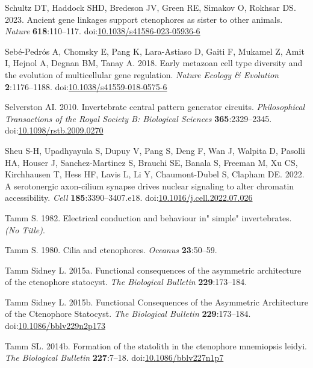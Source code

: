 \documentclass[
  11pt,
]{article}
\newlength{\cslhangindent}
\newenvironment{CSLReferences}[2] %
 {\begin{list}{}{%
  \setlength{\itemindent}{0pt}
  \setlength{\leftmargin}{0pt}
  \setlength{\parsep}{0pt}
  \ifodd #1
   \setlength{\leftmargin}{\cslhangindent}
   \setlength{\itemindent}{-1\cslhangindent}
  \fi
  \setlength{\itemsep}{#2\baselineskip}}}
 {\end{list}}
\begin{document}
\begin{CSLReferences}{1}{0}
Schultz DT, Haddock SHD, Bredeson JV, Green RE, Simakov O, Rokhsar DS.
2023. Ancient gene linkages support ctenophores as sister to other
animals. \emph{Nature} \textbf{618}:110--117.
doi:\href{https://doi.org/10.1038/s41586-023-05936-6}{10.1038/s41586-023-05936-6}

Sebé-Pedrós A, Chomsky E, Pang K, Lara-Astiaso D, Gaiti F, Mukamel Z,
Amit I, Hejnol A, Degnan BM, Tanay A. 2018. Early metazoan cell type
diversity and the evolution of multicellular gene regulation.
\emph{Nature Ecology \& Evolution} \textbf{2}:1176--1188.
doi:\href{https://doi.org/10.1038/s41559-018-0575-6}{10.1038/s41559-018-0575-6}

Selverston AI. 2010. Invertebrate central pattern generator circuits.
\emph{Philosophical Transactions of the Royal Society B: Biological
Sciences} \textbf{365}:2329--2345.
doi:\href{https://doi.org/10.1098/rstb.2009.0270}{10.1098/rstb.2009.0270}

Sheu S-H, Upadhyayula S, Dupuy V, Pang S, Deng F, Wan J, Walpita D,
Pasolli HA, Houser J, Sanchez-Martinez S, Brauchi SE, Banala S, Freeman
M, Xu CS, Kirchhausen T, Hess HF, Lavis L, Li Y, Chaumont-Dubel S,
Clapham DE. 2022. A serotonergic axon-cilium synapse drives nuclear
signaling to alter chromatin accessibility. \emph{Cell}
\textbf{185}:3390--3407.e18.
doi:\href{https://doi.org/10.1016/j.cell.2022.07.026}{10.1016/j.cell.2022.07.026}

Tamm S. 1982. Electrical conduction and behaviour in" simple"
invertebrates. \emph{(No Title)}.

Tamm S. 1980. Cilia and ctenophores. \emph{Oceanus} \textbf{23}:50--59.

Tamm Sidney L. 2015a. Functional consequences of the asymmetric
architecture of the ctenophore statocyst. \emph{The Biological Bulletin}
\textbf{229}:173--184.

Tamm Sidney L. 2015b. Functional Consequences of the Asymmetric
Architecture of the Ctenophore Statocyst. \emph{The Biological Bulletin}
\textbf{229}:173--184.
doi:\href{https://doi.org/10.1086/bblv229n2p173}{10.1086/bblv229n2p173}

Tamm SL. 2014b. Formation of the statolith in the ctenophore mnemiopsis
leidyi. \emph{The Biological Bulletin} \textbf{227}:7--18.
doi:\href{https://doi.org/10.1086/bblv227n1p7}{10.1086/bblv227n1p7}


\end{CSLReferences}
\end{document}
